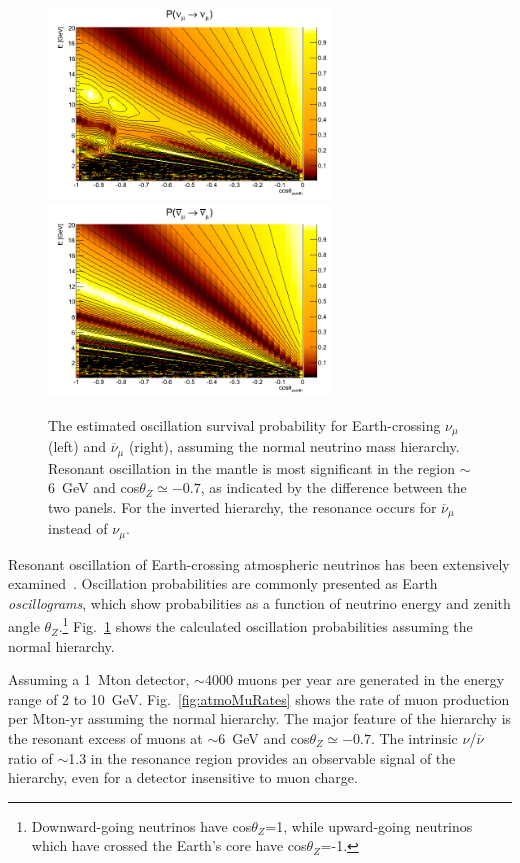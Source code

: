 \begin{figure}[tp]
\begin{center}
\includegraphics[width=7.5cm]{KBL/osc_MuMu_NH_10lyr.png}
\includegraphics[width=7.5cm]{KBL/osc_AntiMuMu_NH_10lyr.png}
\caption{The estimated oscillation survival probability for
  Earth-crossing $\nu_{\mu}$ (left) and $\overline{\nu}_{\mu}$
  (right), assuming the normal neutrino mass hierarchy.  Resonant
  oscillation in the mantle is most significant in the region
  $\sim$6~GeV and cos$\theta_Z\simeq -0.7$, as indicated by the difference between the two panels.  For the inverted hierarchy,
  the resonance occurs for $\overline{\nu}_{\mu}$ instead of
  $\nu_{\mu}$.}
\label{fig:atmoNuProb}
\end{center}
\end{figure}

Resonant oscillation of Earth-crossing atmospheric neutrinos has been
extensively examined~\cite{atm:Petcov1998, atm:Akhmedov2008,
atm:Akhmedov}.  Oscillation probabilities are commonly presented as
Earth {\em oscillograms}, which show probabilities as a function of
neutrino energy and zenith angle $\theta_{Z}$.\footnote{Downward-going
neutrinos have cos$\theta_{Z}$=1, while upward-going neutrinos which
have crossed the Earth's core have cos$\theta_{Z}$=-1.}
Fig.~\ref{fig:atmoNuProb} shows the calculated oscillation
probabilities assuming the normal hierarchy.  

 Assuming a 1~Mton detector,
$\sim$4000 muons per year are generated in the energy range of 2 to
10~GeV.  Fig.~\ref{fig:atmoMuRates} shows the rate of muon production
per Mton-yr assuming the normal hierarchy.  The major feature of the
hierarchy is the resonant excess of muons at $\sim$6~GeV and
cos$\theta_Z\simeq -0.7$.  The intrinsic $\nu$/$\overline{\nu}$ ratio of
$\sim$1.3 in the resonance region provides an observable signal of the
hierarchy, even for a detector insensitive to muon charge.

